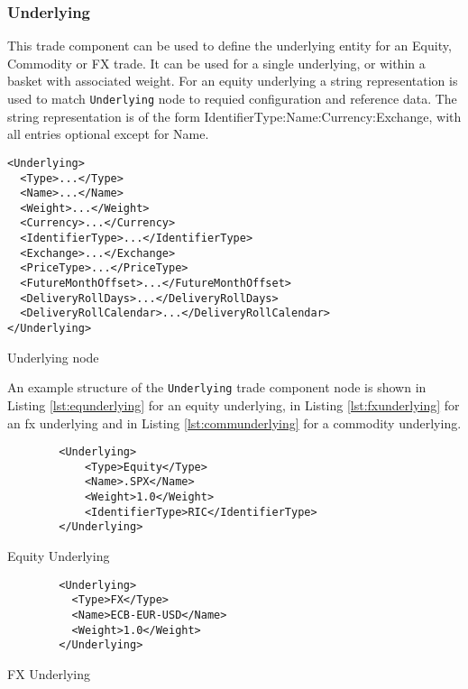 \subsubsection{Underlying}
\label{ss:underlying}

This trade component can be used to define the underlying entity for an Equity, Commodity or FX trade. It can be used for a single underlying, or within a basket with associated weight.
For an equity underlying a string representation is used to match \lstinline!Underlying! node to requied configuration and reference data. The string representation is of the form {IdentifierType}:{Name}:{Currency}:{Exchange}, with all entries optional except for Name.


\begin{listing}[H]
\begin{verbatim}
<Underlying>
  <Type>...</Type>
  <Name>...</Name>
  <Weight>...</Weight>
  <Currency>...</Currency>
  <IdentifierType>...</IdentifierType>
  <Exchange>...</Exchange>
  <PriceType>...</PriceType>
  <FutureMonthOffset>...</FutureMonthOffset>
  <DeliveryRollDays>...</DeliveryRollDays>
  <DeliveryRollCalendar>...</DeliveryRollCalendar>
</Underlying>
\end{verbatim}
\caption{Underlying node}
\label{lst:underlying}
\end{listing}

An example structure of the \lstinline!Underlying! trade component node is shown in Listing \ref{lst:equnderlying} for
an equity underlying, in Listing \ref{lst:fxunderlying} for an fx underlying and in Listing \ref{lst:communderlying} for
a commodity underlying.

\begin{listing}[H]
\begin{verbatim}
        <Underlying>
            <Type>Equity</Type>
            <Name>.SPX</Name>
            <Weight>1.0</Weight>
            <IdentifierType>RIC</IdentifierType>
        </Underlying>
\end{verbatim}
\caption{Equity Underlying}
\label{lst:equnderlying}
\end{listing}

\begin{listing}[H]
\begin{verbatim}
        <Underlying>
          <Type>FX</Type>
          <Name>ECB-EUR-USD</Name>
          <Weight>1.0</Weight>
        </Underlying>
\end{verbatim}
\caption{FX Underlying}
\label{lst:fxunderlying}
\end{listing}

